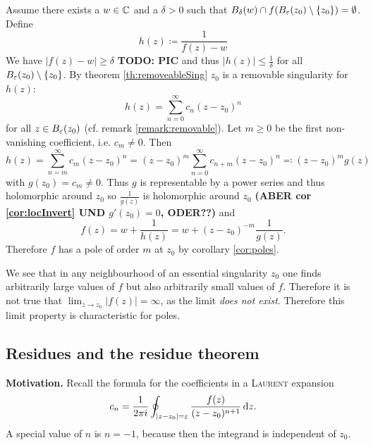 \documentclass[a4paper,english]{article}
\begin{document}
\begin{pr}
    Assume there exists a $w \in \operatorname{\mathbb{C}}$ and a $\delta > 0$ such that $B_{\delta}(w) \cap f(B_{\varepsilon}(z_0) \setminus \{ z_0 \}) = \emptyset$.
    Define
    \begin{equation*}
        h(z)
        \coloneqq \frac{1}{f(z) - w}
    \end{equation*}
    We have $| f(z) - w | \ge \delta$ \textbf{TODO: PIC} and thus $| h(z) | \le \frac{1}{\delta}$ for all $B_{\varepsilon}(z_0) \setminus \{ z_0 \}$.
    By theorem \ref{th:removeableSing} $z_0$ is a removable singularity for $h(z)$:
    \begin{equation*}
        h(z)
        = \sum_{n = 0}^{\infty} c_n (z - z_0)^n
    \end{equation*}
    for all $z \in B_{\varepsilon}(z_0)$ (cf. remark \ref{remark:removable}).
    Let $m \ge 0$ be the first non-vanishing coefficient, i.e. $c_m \ne 0$.
    Then
    \begin{equation*}
        h(z)
        = \sum_{n = m}^{\infty} c_m (z - z_0)^n 
        = (z - z_0)^m \sum_{n = 0}^{\infty} c_{n + m} (z - z_0)^n
        \eqqcolon (z - z_0)^m g(z)
    \end{equation*}
    with $g(z_0) = c_m \ne 0$.
    Thus $g$ is representable by a power series and thus holomorphic around $z_0$ so $\frac{1}{g(z)}$ is holomorphic around $z_0$ \textbf{(ABER cor \ref{cor:locInvert} UND $g'(z_0) = 0$, ODER??)} and
    \begin{equation*}
        f(z)
        = w + \frac{1}{h(z)}
        = w + (z - z_0)^{-m} \frac{1}{g(z)}.
    \end{equation*}
    Therefore $f$ has a pole of order $m$ at $z_0$ by corollary \ref{cor:poles}.
\end{pr}

We see that in any neighbourhood of an essential singularity $z_0$ one finds arbitrarily large values of $f$ but also arbitrarily small values of $f$.
Therefore it is not true that $\lim_{z \to z_0} | f(z) | = \infty$, as the limit \textit{does not exist}.
Therefore this limit property is characteristic for poles.

\subsection{Residues and the residue theorem}

\textbf{Motivation.}
Recall the formula for the coefficients in a \textsc{Laurent} expansion
\begin{equation*}
    c_n
    = \frac{1}{2 \pi i} \oint_{| z - z_0 | = \varepsilon} \frac{f(z)}{(z - z_0)^{n + 1}} \mathop{}\!\mathrm{d}{z}.
\end{equation*}
A special value of $n$ is $n = -1$, because then the integrand is independent of $z_0$.
\end{document}
